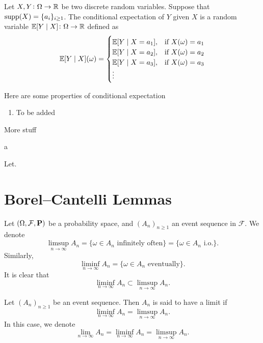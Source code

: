 \documentclass[11pt,a4paper]{article}
\begin{document}
  \begin{definition}
    Let $X,Y \colon \Omega \to \mathbb{R}$ be two discrete random variables.
    Suppose that $\operatorname{supp}(X) = \{a_i\}_{i \geq 1}$.
    The conditional expectation of $Y$ given $X$ is a random variable
    $\mathbb{E}[Y \mid X] \colon \Omega \to \mathbb{R}$ defined as
    \[
      \mathbb{E}[Y \mid X](\omega) =
      \begin{cases}
        \mathbb{E}[Y \mid X = a_1], &\text{if } X(\omega) = a_1 \\
        \mathbb{E}[Y \mid X = a_2], &\text{if } X(\omega) = a_2 \\
        \mathbb{E}[Y \mid X = a_3], &\text{if } X(\omega) = a_3 \\
        \vdots
      \end{cases}
    \]
  \end{definition}

  Here are some properties of conditional expectation
  \begin{enumerate}
    \item To be added
  \end{enumerate}

  More stuff

  \begin{definition}
    a
  \end{definition}
  \begin{definition}
    Let. 
  \end{definition}

  \newpage

  \section{Borel--Cantelli Lemmas}

  Let $(\Omega, \mathcal F, \mathbf{P})$ be a probability space, and 
  $(A_n)_{n \geq 1}$ an event sequence in $\mathcal F$.
  We denote
  \[
    \limsup_{n \to \infty} A_n =
    \{\omega \in A_n\text{ infinitely often}\} =
    \{\omega \in A_n\text{ i.o.}\}.
  \]
  Similarly,
  \[
    \liminf_{n \to \infty} A_n =
    \{\omega \in A_n \text{ eventually}\}.
  \]
  It is clear that
  \[
    \liminf_{n \to \infty} A_n \subset \limsup_{n \to \infty} A_n.
  \]
  \begin{definition}
    Let $(A_n)_{n \geq 1}$ be an event sequence.
    Then $A_n$ is said to have a limit if
    \[
      \liminf_{n \to \infty} A_n = \limsup_{n \to \infty} A_n.
    \]
    In this case, we denote
    \[
      \lim_{n \to \infty} A_n =
      \liminf_{n \to \infty} A_n = \limsup_{n \to \infty} A_n.
    \]
  \end{definition}
\end{document}
